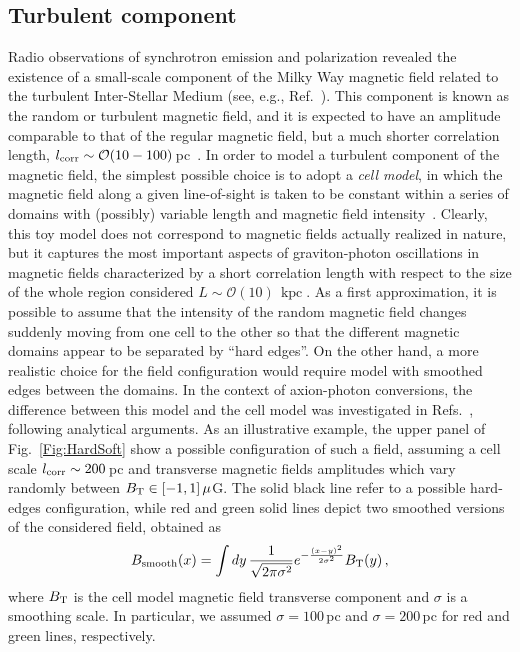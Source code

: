 \documentclass[twocolumn,superscriptaddress,floatfix,preprintnumbers, nofootinbib,hyperref]{revtex4-2}
\DeclareMathOperator{\kpc}{kpc}
\begin{document}
\subsection{Turbulent component}
\label{sec:RegVSTurb}
Radio observations of synchrotron emission and polarization revealed the existence of a small-scale component of the Milky Way magnetic field related to the turbulent Inter-Stellar Medium (see, e.g., Ref.~\cite{Reich:2001fb}). This component is known as the random or turbulent magnetic field, and it is expected to have an amplitude comparable to that of the regular magnetic field, but a much shorter correlation length, $l_{\rm corr}\sim \mathcal{O}(10-100)\,$pc~\cite{Iacobelli:2013fqa,Haverkorn:2008tb,Malkov:2010yq}. In order to model a turbulent component of the magnetic field, the simplest possible choice is to adopt a \textit{cell model}, in which the magnetic field along a given line-of-sight is taken to be constant within a series of domains with (possibly) variable length and magnetic field intensity~\cite{Conlon:2015uwa,Marsh:2017yvc,Marsh:2021ajy}. Clearly, this toy model does not correspond to magnetic fields actually realized in nature, but it captures the most important aspects of graviton-photon oscillations in magnetic fields characterized by a short correlation length with respect to the size of the whole region considered $L\sim\mathcal{O}(10)\,\kpc$. As a first approximation, it is possible to assume that the intensity of the random magnetic field changes suddenly moving from one cell to the other so that the different magnetic domains appear to be separated by ``hard edges''. On the other hand, a more realistic choice for the field configuration would require model with smoothed edges between the domains. In the context of axion-photon conversions, the difference between this model and the cell model was investigated in Refs.~\cite{Galanti:2018nvl,Marsh:2021ajy}, following analytical arguments. As an illustrative example, the upper panel of Fig.~\ref{Fig:HardSoft} show a possible configuration of such a field, assuming a cell scale $l_{\rm corr}\sim 200\,$pc and transverse magnetic fields amplitudes which vary randomly between $B_{\rm T}\in[-1,1]\,\mu$G. The solid black line refer to a possible hard-edges configuration, while red and green solid lines depict two smoothed versions of the considered field, obtained as 
\begin{equation}
    B_{\rm smooth}(x)=\int dy\,\frac{1}{\sqrt{2\pi\sigma^{2}}}e^{-\frac{(x-y)^{2}}{2\sigma^{2}}}B_{\rm T}(y)\,,    
\end{equation}
where $B_{\rm T}$ is the cell model magnetic field transverse component and $\sigma$ is a smoothing scale. In particular, we assumed $\sigma=100\,$pc and $\sigma=200\,$pc for red and green lines, respectively.
\end{document}
